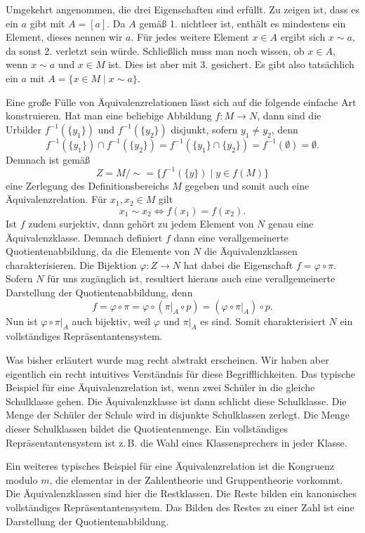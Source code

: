Umgekehrt angenommen, die drei Eigenschaften sind erfüllt.
Zu zeigen ist, dass es ein $a$ gibt mit $A=[a]$. Da $A$ gemäß 1.
nichtleer ist, enthält es mindestens ein Element, dieses nennen wir
$a$. Für jedes weitere Element $x\in A$ ergibt sich
$x\sim a$, da sonst 2. verletzt sein würde. Schließlich muss man
noch wissen, ob $x\in A$, wenn $x\sim a$ und $x\in M$ ist.
Dies ist aber mit 3. gesichert. Es gibt also
tatsächlich ein $a$ mit $A=\{x\in M\mid x\sim a\}$.\;\qedsymbol

Eine große Fülle von Äquivalenzrelationen lässt sich auf die folgende
einfache Art konstruieren. Hat man eine beliebige Abbildung
$f\colon M\to N$, dann sind die Urbilder $f^{-1}(\{y_1\})$ und
$f^{-1}(\{y_2\})$ disjunkt, sofern $y_1\ne y_2$, denn%
\[f^{-1}(\{y_1\})\cap f^{-1}(\{y_2\}) = f^{-1}(\{y_1\}\cap\{y_2\})
= f^{-1}(\emptyset) = \emptyset.\]
Demnach ist gemäß
\[Z = M/{\sim} = \{f^{-1}(\{y\})\mid y\in f(M)\}\]
eine Zerlegung des Definitionsbereichs $M$ gegeben und somit auch eine
Äquivalenzrelation. Für $x_1,x_2\in M$ gilt%
\[x_1\sim x_2 \iff f(x_1) = f(x_2).\]
Ist $f$ zudem surjektiv, dann gehört zu jedem Element von $N$ genau eine
Äquivalenzklasse. Demnach definiert $f$ dann eine verallgemeinerte
Quotientenabbildung, da die Elemente von $N$ die Äquivalenzklassen
charakterisieren. Die Bijektion $\varphi\colon Z\to N$ hat dabei
die Eigenschaft $f = \varphi\circ\pi$. Sofern $N$ für uns zugänglich
ist, resultiert hieraus auch eine verallgemeinerte Darstellung der
Quotientenabbildung, denn
\[f = \varphi\circ\pi = \varphi\circ (\pi|_A\circ p)
= (\varphi\circ\pi|_A)\circ p.\]
Nun ist $\varphi\circ\pi|_A$ auch bijektiv, weil $\varphi$
und $\pi|_A$ es sind. Somit charakterisiert $N$ ein
vollständiges Repräsentantensystem.

Was bisher erläutert wurde mag recht abstrakt erscheinen. Wir haben
aber eigentlich ein recht intuitives Verständnis für diese
Begrifflichkeiten. Das typische Beispiel für eine Äquivalenzrelation
ist, wenn zwei Schüler in die gleiche Schulklasse gehen. Die
Äquivalenzklasse ist dann schlicht diese Schulklasse. Die Menge
der Schüler der Schule wird in disjunkte Schulklassen zerlegt.
Die Menge dieser Schulklassen bildet die Quotientenmenge. Ein
vollständiges Repräsentantensystem ist z.\,B. die Wahl eines
Klassensprechers in jeder Klasse.

Ein weiteres typisches Beispiel für eine Äquivalenzrelation ist die
Kongruenz modulo $m$, die elementar in der Zahlentheorie
und Gruppentheorie vorkommt. Die Äquivalenzklassen sind hier die
Restklassen. Die Reste bilden ein kanonisches vollständiges
Repräsentantensystem. Das Bilden des Restes zu einer Zahl ist
eine Darstellung der Quotientenabbildung.

